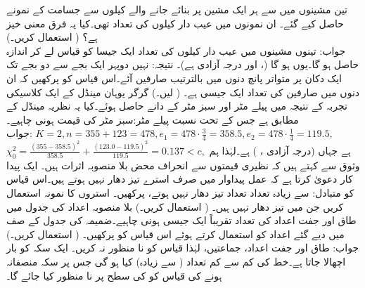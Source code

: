 \quad
تین مشینوں میں سے ہر ایک مشین  پر بنائے جانے والے کیلوں سے  جسامت کے نمونے  حاصل کیے گئے۔ ان نمونوں میں عیب دار کیلوں کی تعداد  تھی۔کیا یہ فرق معنی خیز ہے؟ ( استعمال کریں۔)\\
جواب:\quad
تینوں مشینوں میں عیب دار کیلوں کی تعداد ایک جیسا کو قیاس  لے کر  اندازہ حاصل ہو گا۔یوں  ہو گا (، اور درجہ آزادی  ہے)۔ نتیجہ: نہیں
\quad
دوپہر ایک بجے سے دو بجے تک ایک دکان پر متواتر پانچ دنوں میں بالترتیب  صارفین آئے۔اس قیاس کو پرکھیں کہ ان دنوں میں صارفین کی تعداد ایک جیسی ہے۔ ( لیں۔) 
\quad
گرگر یوہان مینڈل کے ایک کلاسیکی تجربہ کے نتیجہ میں  پیلے مٹر اور  سبز مٹر کے دانے حاصل ہوئے۔کیا یہ نظریہ مینڈل کے مطابق ہے جس کے تحت  نسبت پیلے مٹر:سبز مٹر   کی قیمت  ہونی چاہیے۔\\
جواب:\quad
$K=2,n=355+123=478,e_1=478\cdot \tfrac{3}{4}=358.5,e_2=478\cdot\tfrac{1}{4}=119.5,$\\
$\chi^2_0=\tfrac{(355-358.5)^2}{358.5}+\tfrac{(123.0-119.5)^2}{119.5}=0.137<c,$
ہے جہاں  (درجہ آزادی ، ) ہے۔لہٰذا ہم  وثوق سے کہتے ہیں کہ نظیری قیمتوں سے انحراف محض بلا منصوبہ اثرات ہیں۔
\quad
ایک پیدا کار دعویٰ کرتا ہے کہ عمل پیداوار میں صرف  استرے  تیز دھار نہیں ہوتے ہیں۔اس قیاس کو متبادل:  سے زیادہ تعداد تعداد تیز دھار نہیں ہوتے، پرکھیں۔  استروں کا نمونہ استعمال کریں جن میں  تیز دھار نہیں ہیں۔ ( استعمال کریں۔)
\quad
بلا منصوبہ اعداد کی جدول میں طاق اور جفت اعداد کی تعداد تقریباً ایک جیسی ہونی چاہیے۔ضمیمہ  کی جدول  کے صف   میں دیے گئے  اعداد کو استعمال کرتے ہوئے اس قیاس کو پرکھیں۔ ( استعمال کریں۔) \\
جواب:\quad
{} طاق  اور  جفت اعداد،  جماعتیں،  لہٰذا قیاس کو نا منظور نہ کریں۔
\quad
ایک سکہ کو  بار اچھالا جاتا ہے۔خط کی کم سے کم تعداد ( سے زیادہ) کیا ہو گی جس پر سکہ منصفانہ ہونے  کی قیاس کو  کی سطح پر نا منظور کیا جائے گا۔
